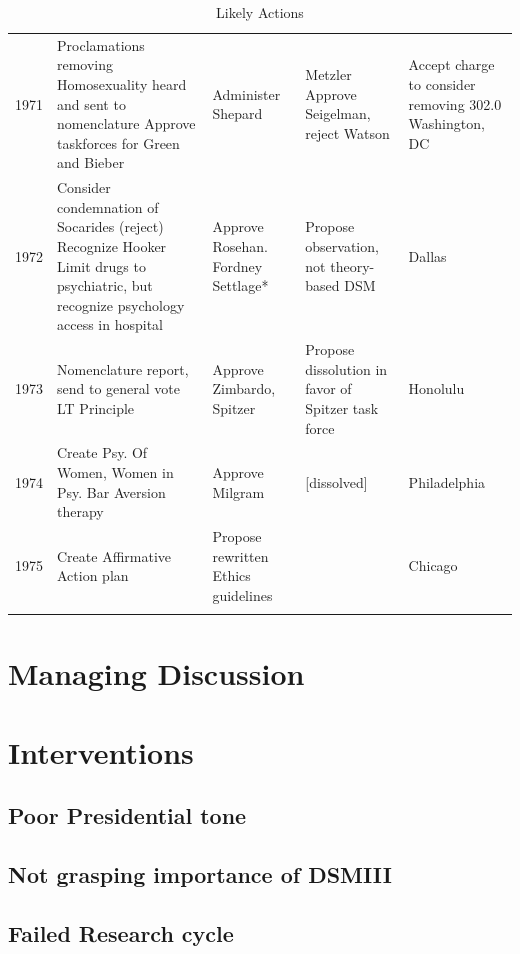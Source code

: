 \begin{refsection}
\begin{longtable}[!t]{ | p{1cm} | p{2cm} | p{1cm} |  p{10cm} | p{2cm} | }
1971&
Proclamations removing Homosexuality heard and sent to nomenclature\newline
Approve taskforces for Green and Bieber &
Administer Shepard & Metzler\newline
Approve Seigelman, reject Watson&
Accept charge to consider removing 302.0
Washington, DC\\
1972&
Consider condemnation of Socarides (reject)\newline
Recognize Hooker\newline
Limit drugs to psychiatric, but recognize psychology access in hospital&
Approve Rosehan. Fordney Settlage*&
Propose observation, not theory-based DSM&
Dallas\\
1973&
Nomenclature report, send to general vote\newline
LT Principle&
Approve Zimbardo, Spitzer&
Propose dissolution in favor of Spitzer task force&
Honolulu\\
1974&
Create Psy. Of Women, Women in Psy.\newline
Bar Aversion therapy&
Approve Milgram&
[dissolved]&
Philadelphia\\
1975&
Create Affirmative Action plan&
Propose rewritten Ethics guidelines&
 &
Chicago\\
\hline

\caption{Likely Actions}
\label{table: likelyactions}
\end{longtable}

\section{Managing Discussion}
\label{managingdiscussion}

\section{Interventions}
\label{interventions}

\subsection{Poor Presidential tone}
\label{poorpresidentialtone}

\subsection{Not grasping importance of DSMIII}
\label{notgraspingimportanceofdsmiii}

\subsection{Failed Research cycle}
\label{failedresearchcycle}


\end{refsection}
